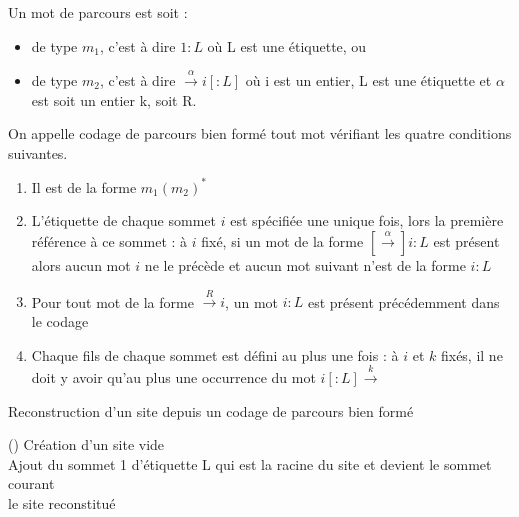\begin{defi}
 Un mot de parcours est soit :
 \begin{itemize}
  \item de type $m_1$, c'est à dire $1:L$ où L est une étiquette, ou
  \item de type $m_2$, c'est à dire $\xrightarrow{\alpha}i[:L]$ où i est un entier, L est une étiquette et $\alpha$ est soit un entier k, soit R.
 \end{itemize}
 \label{def-mot-bien-forme}
\end{defi}

\begin{defi}
 On appelle codage de parcours bien formé tout mot vérifiant les quatre conditions suivantes.
\begin{enumerate}
 \item Il est de la forme $m_1(m_2)^*$
 \item L'étiquette de chaque sommet $i$ est spécifiée une unique fois, lors la première référence à ce sommet : à $i$ fixé, si un mot de la forme $[\xrightarrow{\alpha}]i:L$ est présent alors aucun mot $i$ ne le précède et aucun mot suivant n'est de la forme $i:L$
 \item Pour tout mot de la forme $\xrightarrow{R}i$, un mot $i:L$ est présent précédemment dans le codage
 \item Chaque fils de chaque sommet est défini au plus une fois : à $i$ et $k$ fixés, il ne doit y avoir qu'au plus une occurrence du mot $i[:L]\xrightarrow{k}$
\end{enumerate} 
\label{def-codage-bien-forme}
\end{defi}



\begin{algorithm}[h] %
\caption{Reconstruction d'un site depuis un codage de parcours bien formé}
\SetAlgoLined
{}
\Fn(){}{
Création d'un site vide\\
Ajout du sommet 1 d'étiquette L qui est la racine du site et devient le sommet courant\\
  \Return le site reconstitué
}
\label{algo:siteDepuisCodage}
\end{algorithm}

